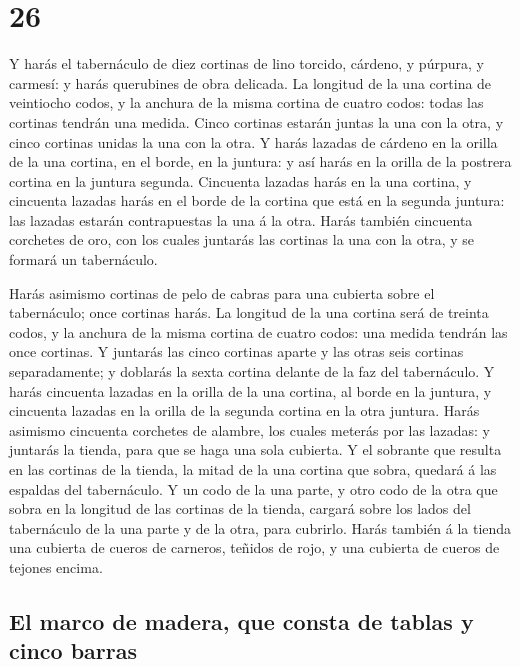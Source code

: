 \hypertarget{section-25}{%
\section{26}\label{section-25}}

 Y harás el tabernáculo de diez cortinas de lino torcido,
cárdeno, y púrpura, y carmesí: y harás querubines de obra delicada.
 La longitud de la una cortina de veintiocho codos, y la
anchura de la misma cortina de cuatro codos: todas las cortinas tendrán
una medida.  Cinco cortinas estarán juntas la una con la
otra, y cinco cortinas unidas la una con la otra.  Y harás
lazadas de cárdeno en la orilla de la una cortina, en el borde, en la
juntura: y así harás en la orilla de la postrera cortina en la juntura
segunda.  Cincuenta lazadas harás en la una cortina, y
cincuenta lazadas harás en el borde de la cortina que está en la segunda
juntura: las lazadas estarán contrapuestas la una á la otra.
 Harás también cincuenta corchetes de oro, con los cuales
juntarás las cortinas la una con la otra, y se formará un tabernáculo.

 Harás asimismo cortinas de pelo de cabras para una cubierta
sobre el tabernáculo; once cortinas harás.  La longitud de
la una cortina será de treinta codos, y la anchura de la misma cortina
de cuatro codos: una medida tendrán las once cortinas.  Y
juntarás las cinco cortinas aparte y las otras seis cortinas
separadamente; y doblarás la sexta cortina delante de la faz del
tabernáculo.  Y harás cincuenta lazadas en la orilla de la
una cortina, al borde en la juntura, y cincuenta lazadas en la orilla de
la segunda cortina en la otra juntura.  Harás asimismo
cincuenta corchetes de alambre, los cuales meterás por las lazadas: y
juntarás la tienda, para que se haga una sola cubierta.  Y
el sobrante que resulta en las cortinas de la tienda, la mitad de la una
cortina que sobra, quedará á las espaldas del tabernáculo. 
Y un codo de la una parte, y otro codo de la otra que sobra en la
longitud de las cortinas de la tienda, cargará sobre los lados del
tabernáculo de la una parte y de la otra, para cubrirlo. 
Harás también á la tienda una cubierta de cueros de carneros, teñidos de
rojo, y una cubierta de cueros de tejones encima.

\hypertarget{el-marco-de-madera-que-consta-de-tablas-y-cinco-barras}{%
\subsection{El marco de madera, que consta de tablas y cinco
barras}\label{el-marco-de-madera-que-consta-de-tablas-y-cinco-barras}}

